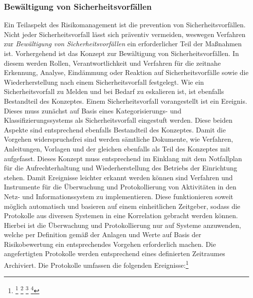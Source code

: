 \documentclass[11pt,a4paper,hidelinks]{article}   %
\begin{document}
            \subsubsection{Bewältigung von Sicherheitsvorfällen}
            Ein Teilaspekt des Risikomanagement ist die prevention von Sicherheitsvorfällen. Nicht jeder Sicherheitsvorfall lässt sich präventiv vermeiden, weswegen Verfahren zur \emph{Bewältigung von Sicherheitsvorfällen} ein erforderlicher Teil der Maßnahmen ist. Vorhergehend ist das Konzept zur Bewältigung von Sicherheitsvorfällen. In diesem werden Rollen, Verantwortlichkeit und Verfahren für die zeitnahe Erkennung, Analyse, Eindämmung oder Reaktion auf Sicherheitsvorfälle sowie die Wiederherstellung nach einem Sicherheitsvorfall festgelegt. Wie ein Sicherheitsvorfall zu Melden und bei Bedarf zu eskalieren ist, ist ebenfalls Bestandteil des Konzeptes. Einem Sicherheitsvorfall vorangestellt ist ein Ereignis. Dieses muss zunächst auf Basis eines Kategorisierungs- und Klassifizierungssystems als Sicherheitsvorfall eingestuft werden. Diese beiden Aspekte sind entsprechend ebenfalls Bestandteil des Konzeptes. Damit die Vorgehen widerspruchsfrei sind werden sämtliche Dokumente, wie Verfahren, Anleitungen, Vorlagen und der gleichen ebenfalls als Teil des Konzeptes mit aufgefasst. Dieses Konzept muss entsprechend im Einklang mit dem Notfallplan für die Aufrechterhaltung und Wiederherstellung des Betriebs der Einrichtung stehen. Damit Ereignisse leichter erkannt werden können sind Verfahren und Instrumente für die Überwachung und Protokollierung von Aktivitäten in den Netz- und Informationssystem zu implementieren. Diese funktionieren soweit möglich automatisch und basieren auf einem einheitlichen Zeitgeber, sodass die Protokolle aus diversen Systemen in eine Korrelation gebracht werden können. Hierbei ist die Überwachung und Protokollierung nur auf Systeme anzuwenden, welche per Definition gemäß der Anlagen und Werte auf Basis der Risikobewertung ein entsprechendes Vorgehen erforderlich machen. Die angefertigten Protokolle werden entsprechend eines definierten Zeitraumes Archiviert. Die Protokolle umfassen die folgenden Ereignisse:\footnote{
                \footcite[Vgl. Nummer 3.1 - 3.2.3, 3.2.5 \& 3.2.6,][, Anhang]{EU2024-2690}
                \footcite[Risikomanagement soll Sicherheitsvorfällen präventiv vermeiden][]{MISSING}
                \footcite[Sicherheitsvorfälle kann man nicht immer vermeiden][]{MISSING}
                \footcite[Vgl. §30 Absatz 2, Nummer 2,][]{NIS2UmsuCG} %
            }
\end{document}
